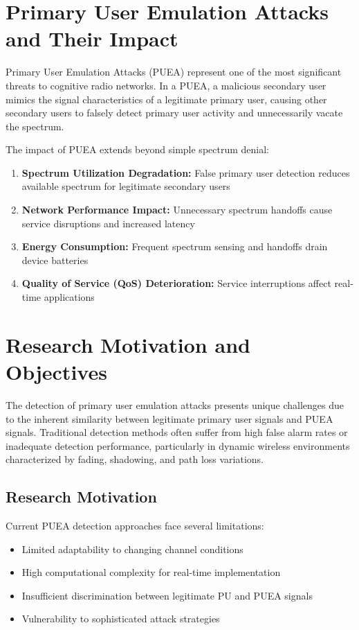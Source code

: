 \section{Primary User Emulation Attacks and Their Impact}
Primary User Emulation Attacks (PUEA) represent one of the most significant threats to cognitive radio networks. In a PUEA, a malicious secondary user mimics the signal characteristics of a legitimate primary user, causing other secondary users to falsely detect primary user activity and unnecessarily vacate the spectrum.

The impact of PUEA extends beyond simple spectrum denial:
\begin{enumerate}
\item \textbf{Spectrum Utilization Degradation:} False primary user detection reduces available spectrum for legitimate secondary users
\item \textbf{Network Performance Impact:} Unnecessary spectrum handoffs cause service disruptions and increased latency
\item \textbf{Energy Consumption:} Frequent spectrum sensing and handoffs drain device batteries
\item \textbf{Quality of Service (QoS) Deterioration:} Service interruptions affect real-time applications
\end{enumerate}

\section{Research Motivation and Objectives}
The detection of primary user emulation attacks presents unique challenges due to the inherent similarity between legitimate primary user signals and PUEA signals. Traditional detection methods often suffer from high false alarm rates or inadequate detection performance, particularly in dynamic wireless environments characterized by fading, shadowing, and path loss variations.

\subsection{Research Motivation}
Current PUEA detection approaches face several limitations:
\begin{itemize}
\item Limited adaptability to changing channel conditions
\item High computational complexity for real-time implementation
\item Insufficient discrimination between legitimate PU and PUEA signals
\item Vulnerability to sophisticated attack strategies
\end{itemize}

